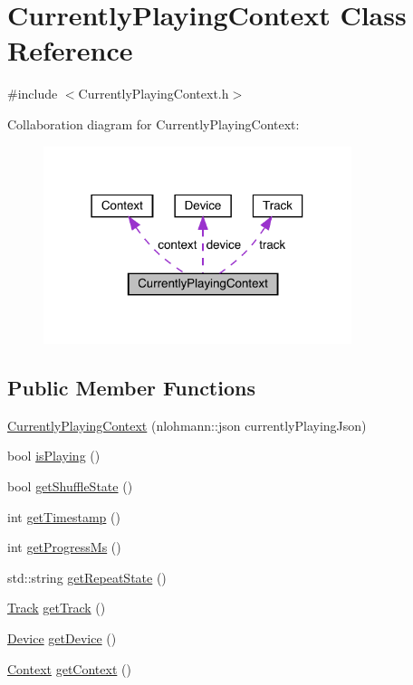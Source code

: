 \hypertarget{class_currently_playing_context}{}\section{Currently\+Playing\+Context Class Reference}
\label{class_currently_playing_context}


{\ttfamily \#include $<$Currently\+Playing\+Context.\+h$>$}



Collaboration diagram for Currently\+Playing\+Context\+:
\nopagebreak
\begin{figure}[H]
\begin{center}
\leavevmode
\includegraphics[width=255pt]{class_currently_playing_context__coll__graph}
\end{center}
\end{figure}
\subsection*{Public Member Functions}
\begin{DoxyCompactItemize}
\item 
\mbox{\hyperlink{class_currently_playing_context_a4eb10b196396f8766c6dc39b22a4eed5}{Currently\+Playing\+Context}} (nlohmann\+::json currently\+Playing\+Json)
\item 
bool \mbox{\hyperlink{class_currently_playing_context_a54ac2c6e99e0f7a435a5bc726e4818b3}{is\+Playing}} ()
\item 
bool \mbox{\hyperlink{class_currently_playing_context_a0104f25d9533804fef7ef35470c16ce7}{get\+Shuffle\+State}} ()
\item 
int \mbox{\hyperlink{class_currently_playing_context_aa3c0456d0164495b2ba7f89bb9c6f57a}{get\+Timestamp}} ()
\item 
int \mbox{\hyperlink{class_currently_playing_context_af75403338a29e06b2948ee3b7c9ca207}{get\+Progress\+Ms}} ()
\item 
std\+::string \mbox{\hyperlink{class_currently_playing_context_a66a5face7cdcb884ed61ec03071f8e38}{get\+Repeat\+State}} ()
\item 
\mbox{\hyperlink{class_track}{Track}} \mbox{\hyperlink{class_currently_playing_context_ab2ee22004530d8e5d37aef083694f3c8}{get\+Track}} ()
\item 
\mbox{\hyperlink{class_device}{Device}} \mbox{\hyperlink{class_currently_playing_context_a7e0b558d2fb6fc1932e143e680de76d1}{get\+Device}} ()
\item 
\mbox{\hyperlink{class_context}{Context}} \mbox{\hyperlink{class_currently_playing_context_afa603459ef011d1bf2e487216fe0bf71}{get\+Context}} ()
\end{DoxyCompactItemize}
